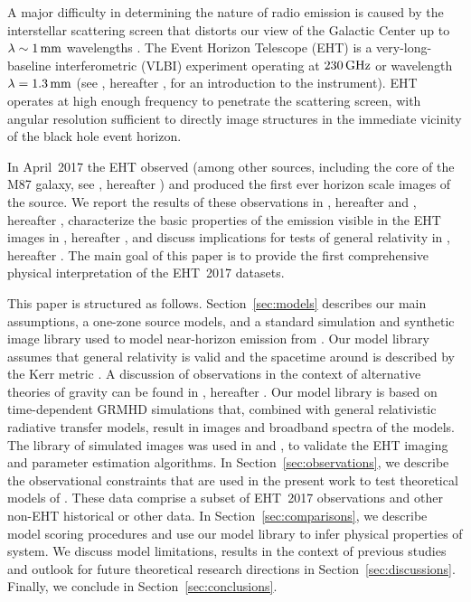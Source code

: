 A major difficulty in determining the nature of \sgra radio emission is caused by the interstellar scattering screen that distorts our view of the Galactic Center up to $\lambda \sim 1\,\mathrm{mm}$ wavelengths
\citep[see][and references therein]{2018arXiv180501242P, 2018ApJ...865..104J,2019ApJ...871...30I}.
The Event Horizon Telescope (EHT) is a very-long-baseline interferometric (VLBI) experiment operating at $230\,\mathrm{GHz}$ or wavelength $\lambda = 1.3\,\mathrm{mm}$ (see \citealt{M87PaperII}, hereafter , for an introduction to the instrument).
EHT operates at high enough frequency to penetrate the scattering screen, with angular resolution sufficient to directly image structures in the immediate vicinity of the black hole event horizon.

In April~2017 the EHT observed \sgra (among other sources, including the core of the M87 galaxy, see \citealt{M87PaperI}, hereafter ) and produced the first ever horizon scale images of the source.
We report the results of these observations in \citet{PaperII}, hereafter  and \citet{PaperIII}, hereafter , characterize the basic properties of the emission visible in the EHT images in \citealt{PaperIV}, hereafter , and discuss implications for tests of general relativity in \citealt{PaperVI}, hereafter .
The main goal of this paper  is to provide the first comprehensive physical interpretation of the EHT~2017 \sgra datasets.

This paper is structured as follows.
Section~\ref{sec:models} describes our main assumptions, a one-zone source models, and a standard simulation and synthetic image library used to model near-horizon emission from \sgra.
Our model library assumes that general relativity is valid and the spacetime around \sgra is described by the Kerr metric  \citep{1963PhRvL..11..237K}.
A discussion of \sgra observations in the context of alternative theories of gravity can be found in  \citet{PaperVI}, hereafter .
Our model library is based on time-dependent GRMHD simulations that, combined with general relativistic radiative transfer models, result in images and broadband spectra of the models.
The library of simulated images was used in  and , to validate the \sgra EHT imaging and parameter estimation algorithms.
In Section~\ref{sec:observations}, we describe the  observational constraints that are used in the present work to test theoretical models of \sgra.
These data comprise a subset of EHT~2017 observations and other non-EHT historical or other data.
In Section~\ref{sec:comparisons}, we describe model scoring procedures and use our model library to infer physical properties of \sgra system.
We discuss model limitations, results in the context of previous studies and outlook for future \sgra theoretical research directions in Section~\ref{sec:discussions}.
Finally, we conclude in Section~\ref{sec:conclusions}.

